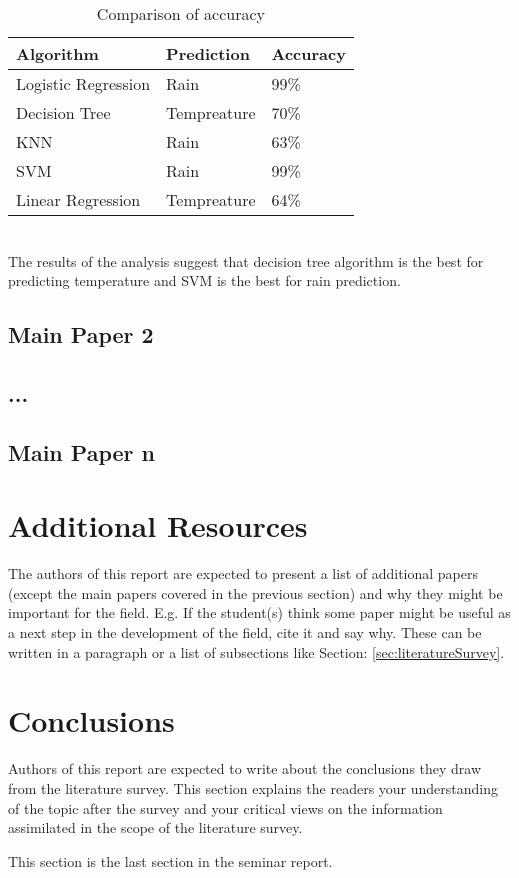 \documentclass[]{tukseminar}
\begin{document}
\begin{table}[h]
\centering
\caption{Comparison of accuracy}
\begin{tabular}{ p{4.5cm}p{4.5cm}p{4.5cm}  }
\hline
Algorithm & Prediction & Accuracy \\
\hline
Logistic Regression & Rain & 99\% \\
Decision Tree & Tempreature & 70\% \\
KNN & Rain & 63\% \\
SVM & Rain & 99\% \\
Linear Regression & Tempreature & 64\%   \\
\hline
\end{tabular}
\end{table}
\\
The results of the analysis suggest that decision tree algorithm is the best for predicting temperature and SVM is the best for rain prediction.

\subsection{Main Paper 2}
\subsection{...}
\subsection{Main Paper n}

\section{Additional Resources}
\label{sec:additionalResources}
The authors of this report are expected to present a list of additional papers (except the main papers covered in the previous section) and why they might be important for the field. E.g. If the student(s) think some paper might be useful as a next step in the development of the field, cite it and say why. These can be written in a paragraph or a list of subsections like Section: \ref{sec:literatureSurvey}. 

\section{Conclusions}
\label{sec:conclusions}
Authors of this report are expected to write about the conclusions they draw from the literature survey. This section explains the readers your understanding of the topic after the survey and your critical views on the information assimilated in the scope of the literature survey. 

This section is the last section in the seminar report.

















\nocite{*}




\end{document}
